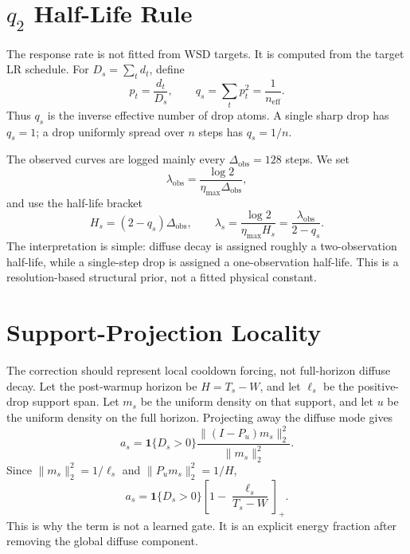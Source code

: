 \documentclass{article}
\newcommand{\obs}{\mathrm{obs}}
\begin{document}
\section[q2 Half-Life Rule]{\(q_2\) Half-Life Rule}
The response rate is not fitted from WSD targets.  It is computed from the target LR schedule.
For \(D_s=\sum_t d_t\), define
\begin{equation}
  p_t=\frac{d_t}{D_s},\qquad
  q_s=\sum_t p_t^2=\frac{1}{n_{\mathrm{eff}}}.
\end{equation}
Thus \(q_s\) is the inverse effective number of drop atoms.  A single sharp drop has
\(q_s=1\); a drop uniformly spread over \(n\) steps has \(q_s=1/n\).

The observed curves are logged mainly every \(\Delta_{\obs}=128\) steps.  We set
\begin{equation}
  \lambda_{\obs}
  =
  \frac{\log2}{\eta_{\max}\Delta_{\obs}},
\end{equation}
and use the half-life bracket
\begin{equation}\label{eq:halflife}
  H_s=(2-q_s)\Delta_{\obs},
  \qquad
  \lambda_s=\frac{\log2}{\eta_{\max}H_s}
  =
  \frac{\lambda_{\obs}}{2-q_s}.
\end{equation}
The interpretation is simple: diffuse decay is assigned roughly a two-observation half-life,
while a single-step drop is assigned a one-observation half-life.  This is a resolution-based
structural prior, not a fitted physical constant.

\section{Support-Projection Locality}
The correction should represent local cooldown forcing, not full-horizon diffuse decay.  Let
the post-warmup horizon be \(H=T_s-W\), and let \(\ell_s\) be the positive-drop support span.
Let \(m_s\) be the uniform density on that support, and let \(u\) be the uniform density on
the full horizon.  Projecting away the diffuse mode gives
\begin{equation}
  a_s
  =
  \mathbf 1\{D_s>0\}
  \frac{\|(I-P_u)m_s\|_2^2}{\|m_s\|_2^2}.
\end{equation}
Since \(\|m_s\|_2^2=1/\ell_s\) and \(\|P_um_s\|_2^2=1/H\),
\begin{equation}\label{eq:locality_supp}
  a_s
  =
  \mathbf 1\{D_s>0\}
  \left[1-\frac{\ell_s}{T_s-W}\right]_+ .
\end{equation}
This is why the term is not a learned gate.  It is an explicit energy fraction after removing
the global diffuse component.
\end{document}
